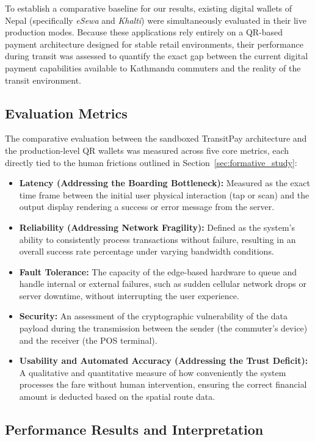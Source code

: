 \documentclass[manuscript,review,anonymous]{acmart}
\begin{document}
To establish a comparative baseline for our results, existing digital wallets of Nepal (specifically \textit{eSewa} and \textit{Khalti}) were simultaneously evaluated in their live production modes. Because these applications rely entirely on a QR-based payment architecture designed for stable retail environments, their performance during transit was assessed to quantify the exact gap between the current digital payment capabilities available to Kathmandu commuters and the reality of the transit environment.

\subsection{Evaluation Metrics}
The comparative evaluation between the sandboxed TransitPay architecture and the production-level QR wallets was measured across five core metrics, each directly tied to the human frictions outlined in Section~\ref{sec:formative_study}:

\begin{itemize}
    \item \textbf{Latency (Addressing the Boarding Bottleneck):} Measured as the exact time frame between the initial user physical interaction (tap or scan) and the output display rendering a success or error message from the server.
    \item \textbf{Reliability (Addressing Network Fragility):} Defined as the system's ability to consistently process transactions without failure, resulting in an overall success rate percentage under varying bandwidth conditions.
    \item \textbf{Fault Tolerance:} The capacity of the edge-based hardware to queue and handle internal or external failures, such as sudden cellular network drops or server downtime, without interrupting the user experience.
     \item \textbf{Security:} An assessment of the cryptographic vulnerability of the data payload during the transmission between the sender (the commuter's device) and the receiver (the POS terminal).
     \item \textbf{Usability and Automated Accuracy (Addressing the Trust Deficit):} A qualitative and quantitative measure of how conveniently the system processes the fare without human intervention, ensuring the correct financial amount is deducted based on the spatial route data.
\end{itemize}

\subsection{Performance Results and Interpretation}
\end{document}
